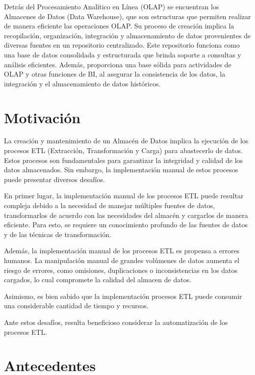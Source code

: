 Detrás del Procesamiento Analítico en Línea (OLAP) se encuentran los Almacenes de Datos (Data Warehouse), que son 
estructuras que permiten realizar de manera eficiente las operaciones OLAP. Su proceso de creaci\'on implica la 
recopilación, 
organización, integración y almacenamiento de datos provenientes de diversas fuentes en un repositorio centralizado. Este 
repositorio funciona como una base de datos consolidada y estructurada que brinda soporte a consultas y análisis eficientes. 
Además, proporciona una base sólida para actividades de OLAP y otras funciones de BI, al 
asegurar la consistencia de los datos, la integración y el almacenamiento de datos históricos.

\section{Motivaci\'on}

La creación y mantenimiento de un Almacén de Datos implica la ejecución de los procesos ETL (Extracción, Transformación y 
Carga) para abastecerlo de datos. Estos procesos son fundamentales para garantizar la integridad y calidad de los datos 
almacenados. Sin embargo, la implementación manual de estos procesos puede presentar diversos desafíos\cite{nwokeji2021systematic}.

En primer lugar, la implementación manual de los procesos ETL puede resultar compleja debido a la necesidad 
de manejar múltiples fuentes de datos, transformarlos de acuerdo con las necesidades del almacén y cargarlos de manera 
eficiente. Para esto, se requiere un conocimiento profundo de las fuentes de datos y de las técnicas de transformación.

Además, la implementación manual de los procesos ETL es propensa a errores humanos. La manipulación manual de grandes 
volúmenes de datos aumenta el riesgo de errores, como omisiones, duplicaciones o inconsistencias en los datos cargados, lo 
cual compromete la calidad del almacen de datos. 

Asimismo, es bien sabido que la implementación procesos ETL puede consumir una considerable cantidad de tiempo y recursos. 

Ante estos desafíos, resulta beneficioso considerar la automatización de los procesos ETL.

\section{Antecedentes}

